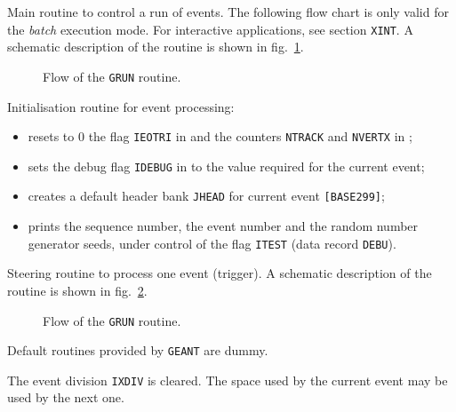    
Main routine to control a run of events. The following flow chart is only 
valid for the {\it batch} execution mode. For interactive applications, 
see section {\tt XINT}. A schematic description of the routine is shown 
in fig.~\ref{fg:base200-1}.
 
\begin{figure}[hbt]
      \centering
      \caption{Flow of the {\tt GRUN} routine.}
      \label{fg:base200-1}
\end{figure}

Initialisation routine for event processing:
\begin{itemize}
\item resets to 0 the flag {\tt IEOTRI} in  and the counters
{\tt NTRACK} and {\tt NVERTX} in ;
\item sets the debug flag
{\tt IDEBUG} in 
to the value required for the current event;
\item creates a default header bank
{\tt JHEAD} for current event {\tt [BASE299]};
\item prints the sequence number, the event number and the random number
generator seeds,
under control of the flag {\tt ITEST} (data record {\tt DEBU}).
\end{itemize}
 
 
Steering routine to process one event (trigger).
A schematic description of the routine is shown 
in fig.~\ref{fg:base200-2}.
 
\begin{figure}[hbt]
      \centering
      \caption{Flow of the {\tt GRUN} routine.}
      \label{fg:base200-2}
\end{figure}

Default routines provided by {\tt GEANT} are dummy.

The event division {\tt IXDIV} is cleared. The space
used by the current event may be used by the next one.
 

